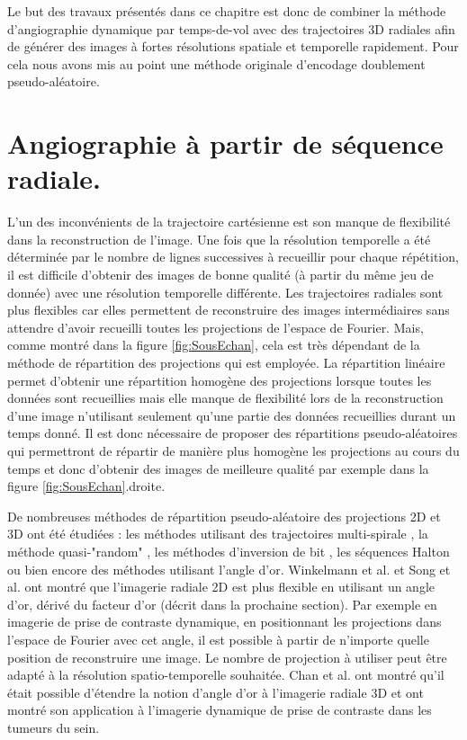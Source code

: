Le but des travaux présentés dans ce chapitre est donc de combiner la méthode d’angiographie dynamique par temps-de-vol avec des trajectoires 3D radiales afin de générer des images à fortes résolutions spatiale et temporelle rapidement. Pour cela nous avons mis au point une méthode originale d’encodage doublement pseudo-aléatoire.


\section{Angiographie à partir de séquence radiale.}

L'un des inconvénients de la trajectoire cartésienne est son manque de flexibilité dans la reconstruction de l'image. Une fois que la résolution temporelle a été déterminée par le nombre de lignes successives à recueillir pour chaque répétition, il est difficile d'obtenir des images de bonne qualité (à partir du même jeu de donnée) avec une résolution temporelle différente.
Les trajectoires radiales sont plus flexibles car elles permettent de reconstruire des images intermédiaires sans attendre d'avoir recueilli toutes les projections de l'espace de Fourier. Mais, comme montré dans la figure \ref{fig:SousEchan}, cela est très dépendant de la méthode de répartition des projections qui est employée. La répartition linéaire permet d'obtenir une répartition homogène des projections lorsque toutes les données sont recueillies mais elle manque de flexibilité lors de la reconstruction d'une image n'utilisant seulement qu'une partie des données recueillies durant un temps donné. Il est donc nécessaire de proposer des répartitions pseudo-aléatoires qui permettront de répartir de manière plus homogène les projections au cours du temps et donc d'obtenir des images de meilleure qualité par exemple dans la figure \ref{fig:SousEchan}.droite.

De nombreuses méthodes de répartition pseudo-aléatoire des projections 2D et 3D ont été étudiées : les méthodes utilisant des trajectoires multi-spirale \cite{Chan:2009uq}, la méthode quasi-"random" \cite{Tibiletti2015Multistage-thre}, les méthodes d'inversion de bit \cite{Theilmann2004View-ordering-i}, les séquences Halton \cite{chan2009halton} ou bien encore des méthodes utilisant l'angle d'or\cite{Winkelmann:2007fk}. Winkelmann et al. \cite{Winkelmann:2007fk} et Song et al. \cite{Song:2000fk} ont montré que l'imagerie radiale 2D est plus flexible en utilisant un angle d'or, dérivé du facteur d'or (décrit dans la prochaine section). Par exemple en imagerie de prise de contraste dynamique, en positionnant les projections dans l'espace de Fourier avec cet angle, il est possible à partir de n'importe quelle position de reconstruire une image. Le nombre de projection à utiliser peut être adapté à la résolution spatio-temporelle souhaitée. Chan et al. \cite{Chan:2009uq} ont montré qu'il était possible d'étendre la notion d'angle d'or à l'imagerie radiale 3D et ont montré son application à l'imagerie dynamique de prise de contraste dans les tumeurs du sein.

